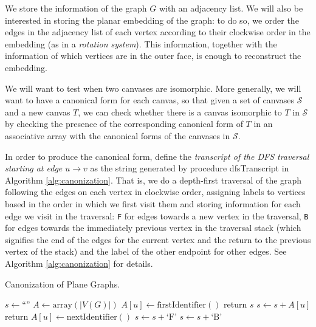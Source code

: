 We store the information of the graph $G$ with an adjacency list. We will also be interested in storing the planar embedding of the graph:
to do so, we order the edges in the adjacency list of each vertex according to their clockwise order in the embedding (as in a
\emph{rotation system}). This information, together with the information of which vertices are in the outer face, is enough to reconstruct
the embedding. 

We will want to test when two canvases are isomorphic. More generally, we will want to have a canonical form for each canvas, so that
given a set of canvases $\mathcal{S}$ and a new canvas $T$, we can check whether there is a canvas isomorphic to $T$ in $\mathcal{S}$ by checking the 
presence of the corresponding canonical form of $T$ in an associative array with the canonical forms of the canvases in $\mathcal{S}$.

In order to produce the canonical form, define the \emph{transcript of the DFS traversal starting at edge $u \rightarrow v$} as the string generated by procedure
dfsTranscript in Algorithm \ref{alg:canonization}. That is, we do a depth-first traversal of the graph following the edges on each vertex in clockwise order, assigning labels to vertices based in the
order in which we first visit them and storing information for each edge we visit in the traversal: \texttt{F} for edges towards a new vertex in the traversal,
\texttt{B} for edges towards the immediately previous vertex in the traversal stack (which signifies the end of the edges for the current vertex and the return
to the previous vertex of the stack) and the label of the other endpoint for other edges. See Algorithm \ref{alg:canonization} for details.

\begin{algorithm}
\caption{Canonization of Plane Graphs.}
\label{alg:canonization}
\SetAlgoLined
{}

 {
	$s \gets \text{``''}$\;
	$A \gets \text{array}(|V(G)|)$\;
	$A[u] \gets \text{firstIdentifier}()$\;
	return $s$\;
}
 {
	 {
		$s \gets s + A[u]$\;
		return\;
	}
	$A[u] \gets \text{nextIdentifier}()$\;
	$s \gets s + \text{`F'}$\;
	$s \gets s + \text{`B'}$\;
}


\end{algorithm}



